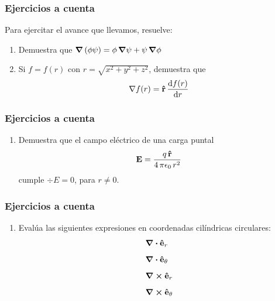 \documentclass[12pt]{beamer}
\begin{document}
\begin{frame}
\frametitle{Ejercicios a cuenta}
Para ejercitar el avance que llevamos, resuelve:
\begin{enumerate}
\item Demuestra que $\grad{\left( \phi \psi \right)} = \phi \, \grad{\psi} + \psi \, \grad{\phi}$
\item Si $f = f(r)$ con $r = \sqrt{x^{2} + y^{2}+ z^{2}}$, demuestra que
\begin{align*}
\nabla{f(r)} = \vu{r} \, \dv{f(r)}{r}
\end{align*}
\seti
\end{enumerate}
\end{frame}
\begin{frame}
\frametitle{Ejercicios a cuenta}
\begin{enumerate}[<+->]
\conti
\item Demuestra que el campo eléctrico de una carga puntal
\begin{align*}
\vb{E} = \dfrac{q \, \vu{r}}{4 \, \pi \epsilon_{0} \, r^{2}}
\end{align*}
cumple $\div{E} = 0$, para $r \neq 0$.
\seti
\end{enumerate}
\end{frame}
\begin{frame}
\frametitle{Ejercicios a cuenta}
\begin{enumerate}[<+->]
\conti
\item Evalúa las siguientes expresiones en coordenadas cilíndricas circulares:
\begin{align*}
&\div{\vu{e}_{r}} \\[0.5em]
&\div{\vu{e}_{\theta}} \\[0.5em]
&\curl{\vu{e}_{r}} \\[0.5em]
&\curl{\vu{e}_{\theta}}
\end{align*}
\seti
\end{enumerate}
\end{frame}
\end{document}
